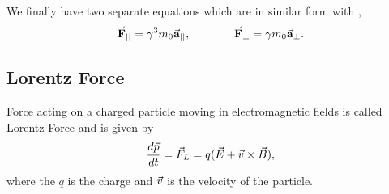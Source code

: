 \documentclass[a4paper,oneside,12pt]{report}
\numberwithin{equation}{chapter}
\begin{document}
\vspace{-20pt}
We finally have two separate equations which are in similar form with ,
\vspace{-20pt}
\begin{equation} \label{eq:Frel_para_and_perp}
    \begin{aligned}
        \vecthreeBF{F}_{||} = \gamma^3  m_0 \vecthreeBF{a}_{||}  ,
    \end{aligned}
    \qquad \qquad
    \begin{aligned}
        \vecthreeBF{F}_{\perp} = \gamma  m_0\vecthreeBF{a}_{\perp} .
    \end{aligned}
    \vspace{-18pt}
\end{equation}

\subsection{Lorentz Force} \label{sec:lorentz-force}
Force acting on a charged particle moving in electromagnetic fields is called Lorentz Force and is given by 
\vspace{-12pt}
\begin{equation} \label{eq:lf}
    \frac{d \vecthree{p}}{d t} = \vecthree{F}_L=q(\vecthree{E}+ \vecthree{v} \times \vecthree{B}) , 
    \vspace{-12pt}
\end{equation}
where the $q$ is the charge and $\vec{v}$ is the velocity of the particle. 
\end{document}

